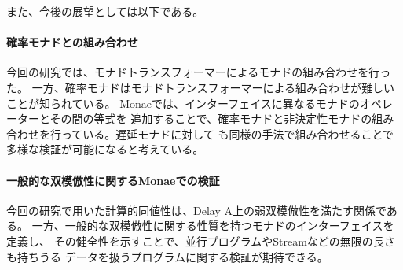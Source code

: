 \documentclass[japanese]{jssst_ppl}
\theoremstyle{definition}
\begin{document}
また、今後の展望としては以下である。
\paragraph{確率モナドとの組み合わせ}
今回の研究では、モナドトランスフォーマーによるモナドの組み合わせを行った。
一方、確率モナドはモナドトランスフォーマーによる組み合わせが難しいことが知られている。%
Monaeでは、インターフェイスに異なるモナドのオペレーターとその間の等式を
追加することで、確率モナドと非決定性モナドの組み合わせを行っている。遅延モナドに対して
も同様の手法で組み合わせることで多様な検証が可能になると考えている。
\paragraph{一般的な双模倣性に関するMonaeでの検証}
今回の研究で用いた計算的同値性は、Delay A上の弱双模倣性を満たす関係である。
一方、一般的な双模倣性に関する性質を持つモナドのインターフェイスを定義し、
その健全性を示すことで、並行プログラムやStreamなどの無限の長さも持ちうる
データを扱うプログラムに関する検証が期待できる。




\end{document}
